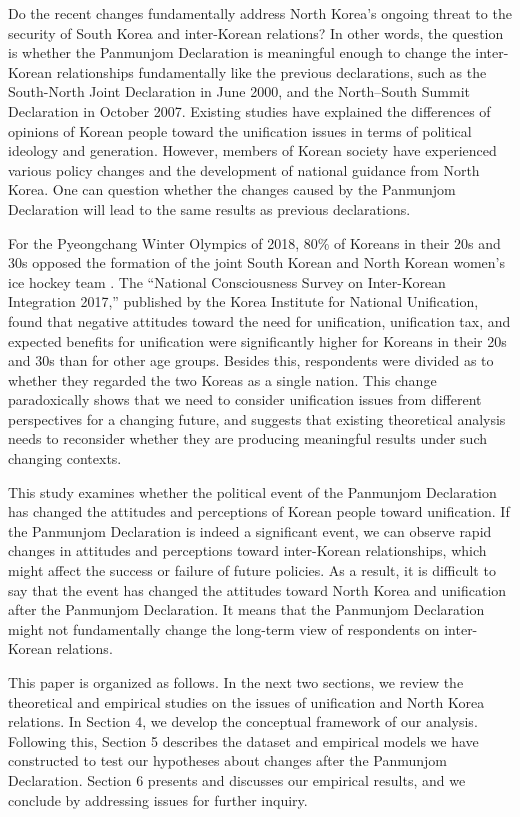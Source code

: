 \documentclass[letterpaper,9pt,twocolumn,twoside,]{pinp}
\begin{document}
Do the recent changes fundamentally address North Korea's ongoing threat
to the security of South Korea and inter-Korean relations? In other
words, the question is whether the Panmunjom Declaration is meaningful
enough to change the inter-Korean relationships fundamentally like the
previous declarations, such as the South-North Joint Declaration in June
2000, and the North--South Summit Declaration in October 2007. Existing
studies have explained the differences of opinions of Korean people
toward the unification issues in terms of political ideology and
generation. However, members of Korean society have experienced various
policy changes and the development of national guidance from North
Korea. One can question whether the changes caused by the Panmunjom
Declaration will lead to the same results as previous declarations.

For the Pyeongchang Winter Olympics of 2018, 80\% of Koreans in their
20s and 30s opposed the formation of the joint South Korean and North
Korean women's ice hockey team \citep{SeongHong2018}. The ``National
Consciousness Survey on Inter-Korean Integration 2017,'' published by
the Korea Institute for National Unification, found that negative
attitudes toward the need for unification, unification tax, and expected
benefits for unification were significantly higher for Koreans in their
20s and 30s than for other age groups. Besides this, respondents were
divided as to whether they regarded the two Koreas as a single nation.
This change paradoxically shows that we need to consider unification
issues from different perspectives for a changing future, and suggests
that existing theoretical analysis needs to reconsider whether they are
producing meaningful results under such changing contexts.

This study examines whether the political event of the Panmunjom
Declaration has changed the attitudes and perceptions of Korean people
toward unification. If the Panmunjom Declaration is indeed a significant
event, we can observe rapid changes in attitudes and perceptions toward
inter-Korean relationships, which might affect the success or failure of
future policies. As a result, it is difficult to say that the event has
changed the attitudes toward North Korea and unification after the
Panmunjom Declaration. It means that the Panmunjom Declaration might not
fundamentally change the long-term view of respondents on inter-Korean
relations.

This paper is organized as follows. In the next two sections, we review
the theoretical and empirical studies on the issues of unification and
North Korea relations. In Section 4, we develop the conceptual framework
of our analysis. Following this, Section 5 describes the dataset and
empirical models we have constructed to test our hypotheses about
changes after the Panmunjom Declaration. Section 6 presents and
discusses our empirical results, and we conclude by addressing issues
for further inquiry.
\end{document}
